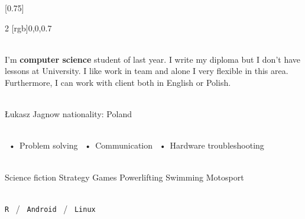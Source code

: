 \documentclass[darkhipster]{simplehipstercv}
\begin{document}
\setlength{\columnsep}{1.5cm}
[0.75]
\begin{paracol}{2}
[rgb]{0,0,0.7} %

\paracolbackgroundoptions



\footnotesize
{\setasidefontcolour
\flushright
\begin{center}
\end{center}

\\[0.5em]

{\footnotesize
I'm \textbf{computer science} student of last year. 
\newline
\newline
I write my diploma but I
don't have lessons at University.
\newline
\newline
I like work in team and alone I very flexible in this
area. Furthermore, I can work with client both in
English or Polish.}
\bigskip

 \\[0.5em]
Łukasz Jagnow
\newline
nationality: Poland 
\bigskip

 \\[0.5em]

~•~Problem solving  
\newline
~•~Communication
\newline
~•~Hardware troubleshooting

\bigskip



\bigskip

\\[0.5em]
Science fiction 
\newline
Strategy Games
\newline
Powerlifting
\newline
Swimming 
\newline
Motosport
\newline
\bigskip

\\[0.5em]

\texttt{R} ~/~ \texttt{Android} ~/~ \texttt{Linux}

}
\end{paracol}
\end{document}
